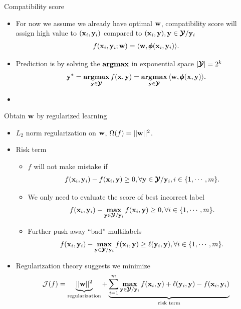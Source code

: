 \documentclass[first=dgreen,second=purple,logo=yellowexc]{aaltoslides}
\begin{document}
{\begin{frame}{Compatibility score}
\begin{itemize}
		\item For now we assume we already have optimal $\mathbf {w}$, compatibility score will assign high value to $(\mathbf {x}_i,\mathbf {y}_i)$ compared to $(\mathbf {x}_i,\mathbf {y}),\mathbf {y}\in\pmb {\mathcal{Y}}/\mathbf {y}_i$
		\begin{align*}
			f(\mathbf {x}_i,\mathbf {y}_i;\mathbf {w}) = \langle \mathbf {w}, \pmb \phi(\mathbf {x}_i,\mathbf {y}_i) \rangle.
		\end{align*}
		\item Prediction is by solving the $\textbf{argmax}$ in exponential space $|\pmb {\mathcal{Y}}|=2^k$
		\begin{align*}
			\mathbf {y}^*= \underset{\mathbf {y}\in\pmb {\mathcal{Y}}}{\textbf{argmax}} \, f(\mathbf {x},\mathbf {y}) =  \underset{\mathbf {y}\in\pmb {\mathcal{Y}}}{\textbf{argmax}} \,\langle \mathbf {w}, \pmb \phi(\mathbf {x},\mathbf {y}) \rangle.
		\end{align*}
		\item 
	\end{itemize}
\end{frame}

\begin{frame}{Obtain $\mathbf {w}$ by regularized learning}
	\begin{itemize}
		\item $L_2$ norm regularization on $\mathbf {w}$, $\Omega(f) = ||\mathbf {w}||^2$.
		\item Risk term
		\begin{itemize}
			\footnotesize
			\item $f$ will not make mistake if
			\begin{align*}
				f(\mathbf {x}_i,\mathbf {y}_i) - f(\mathbf {x}_i,\mathbf {y}) \ge 0, \forall \mathbf {y}\in\pmb {\mathcal{Y}}/\mathbf {y}_i, i\in\{1,\cdots,m\}.
			\end{align*}
			\item We only need to evaluate the score of best incorrect label 
			\begin{align*}
				f(\mathbf {x}_i,\mathbf {y}_i) - \underset{\mathbf {y}\in\pmb {\mathcal{Y}}/\mathbf {y}_i}{\textbf{max}}\,f(\mathbf {x}_i,\mathbf {y}) \ge 0, \forall i\in\{1,\cdots,m\}.
			\end{align*}
			\item Further push away ``bad'' multilabels 
			\begin{align*}
				f(\mathbf {x}_i,\mathbf {y}_i) - \underset{\mathbf {y}\in\pmb {\mathcal{Y}}/\mathbf {y}_i}{\textbf{max}}\,f(\mathbf {x}_i,\mathbf {y}) \ge \ell(\mathbf {y}_i,\mathbf {y}), \forall i\in\{1,\cdots,m\}.
			\end{align*}
		\end{itemize}
		\item Regularization theory suggests we minimize
		\begin{align*}
			\mathcal{J}(f) = \underbrace{||\mathbf {w}||^2}_{\text{regularization}} + \underbrace{\sum_{i=1}^m\underset{\mathbf {y}\in\pmb {\mathcal{Y}}/\mathbf {y}_i}{\textbf{max}}\,f(\mathbf {x}_i,\mathbf {y}) + \ell(\mathbf {y}_i,\mathbf {y}) -  f(\mathbf {x}_i,\mathbf {y}_i) }_{\text{risk term}}
		\end{align*}
	\end{itemize}
\end{frame}

}
\end{document}
